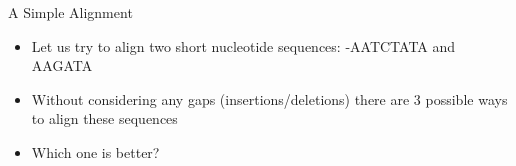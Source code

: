 \documentclass{bredelebeamer}
\begin{document}
\begin{frame}{A Simple Alignment}
    \begin{itemize}
        \item Let us try to align two short nucleotide sequences:\linebreak
        -AATCTATA and AAGATA\linebreak
        \linebreak
        \item Without considering any gaps (insertions/deletions) there are 3 possible ways to align these sequences\linebreak
        \linebreak
\linebreak
    \item Which one is better?
    \end{itemize}
\end{frame}
\end{document}
